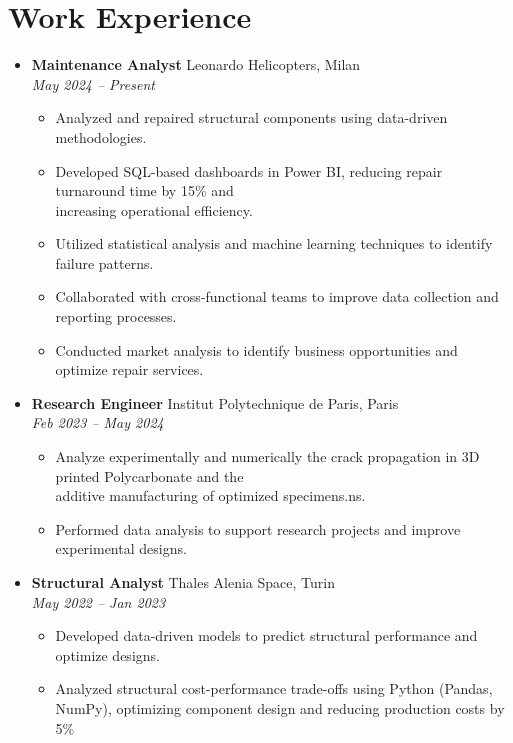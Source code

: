 \documentclass[letterpaper,10.5pt]{article}
\newcommand{\resumeEntry}[4]{
  \item\textbf{#1} \hfill #2\\
  \textit{#3} \hfill \textit{#4}
}
\newcommand{\resumeDescription}[1]{
  \vspace{-2pt}\begin{itemize}[leftmargin=0.2in]
    #1
  \end{itemize}
}
\begin{document}
\section*{Work Experience}\vspace{-5pt}
\begin{itemize}[leftmargin=0.2in]
    \resumeEntry{Maintenance Analyst}{Leonardo Helicopters, Milan}{May 2024 -- Present}{}
    \resumeDescription{
        \item Analyzed and repaired structural components using data-driven methodologies.
        \item Developed SQL-based dashboards in Power BI, reducing repair turnaround time by 15\% and \\ increasing operational efficiency.
        \item Utilized statistical analysis and machine learning techniques to identify failure patterns.
        \item Collaborated with cross-functional teams to improve data collection and reporting processes.
        \item Conducted market analysis to identify business opportunities and optimize repair services.
    }
    \resumeEntry{Research Engineer}{Institut Polytechnique de Paris, Paris}{Feb 2023 -- May 2024}{}
    \resumeDescription{
        \item Analyze experimentally and numerically the crack propagation in 3D printed Polycarbonate and the \\ additive manufacturing of optimized specimens.ns.
        \item Performed data analysis to support research projects and improve experimental designs.
    }
    \resumeEntry{Structural Analyst}{Thales Alenia Space, Turin}{May 2022 -- Jan 2023}{}
    \resumeDescription{
        \item Developed data-driven models to predict structural performance and optimize designs.
        \item Analyzed structural cost-performance trade-offs using Python (Pandas, NumPy), optimizing component design and reducing production costs by 5\%
    }
\end{itemize}

\end{document}
